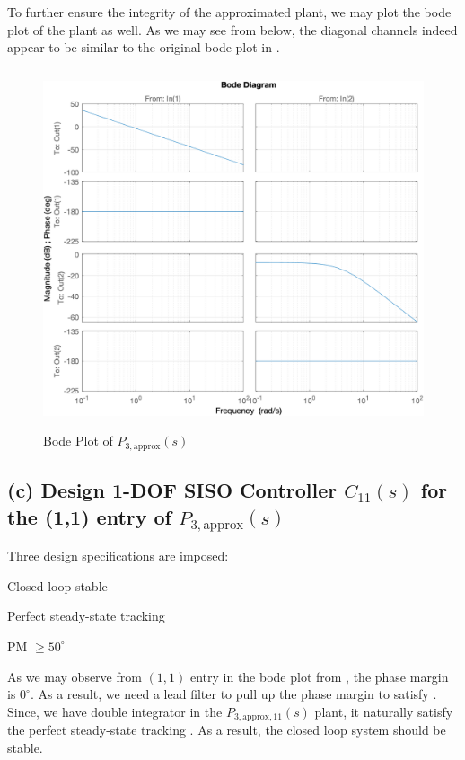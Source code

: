 \documentclass{tron}
\newcommand{\apx}{\text{approx}}
\begin{document}
To further ensure the integrity of the approximated plant, we may plot the bode plot of the plant as well. As we may see from  below, the diagonal channels indeed appear to be similar to the original bode plot in . 
\begin{figure}[H]
	\centering
	\includegraphics[height=400px]{../matlab/output/p5/P3_aug_bode_plot}
	\caption{Bode Plot of $P_{3, \apx}(s)$}
	\label{fig:p5:P3_aug:bode}
\end{figure}

\clearpage
\subsection{(c) Design 1-DOF SISO Controller $C_{11}(s)$ for the (1,1) entry of $P_{3, \apx}(s)$ \label{ans:P5-c}}
Three design specifications are imposed:
\begin{spec-list}
	\item Closed-loop stable \label{spec:stable}
	\item Perfect steady-state tracking \label{spec:track}
	\item PM $\geq 50^{\circ}$ \label{spec:pm}
\end{spec-list}

As we may observe from $(1,1)$ entry in the bode plot from , the phase margin is $0^{\circ}$. As a result, we need a lead filter to pull up the phase margin to satisfy . Since, we have double integrator in the $P_{3, \apx, 11}(s)$ plant, it naturally satisfy the perfect steady-state tracking . As a result, the closed loop system should be stable. 
\end{document}
